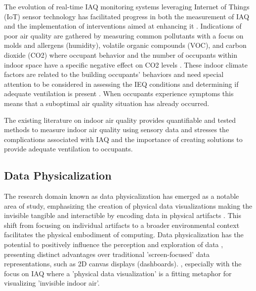 The evolution of real-time IAQ monitoring systems leveraging Internet of Things (IoT) sensor technology has facilitated progress in both the measurement of IAQ and the implementation of interventions aimed at enhancing it \cite{pantelic_transformational_2022}. Indications of poor air quality are gathered by measuring common pollutants with a focus on molds and allergens (humidity), volatile organic compounds (VOC), and carbon dioxide (CO2) \cite{klepeis_national_2001} where occupant behavior and the number of occupants within indoor space have a specific negative effect on CO2 levels \cite{fromme_indoor_2023}. These indoor climate factors are related to the building occupants’ behaviors and need special attention to be considered in assessing the IEQ conditions and determining if adequate ventilation is present \cite{du_indoor_2020}. When occupants experience symptoms this means that a suboptimal air quality situation has already occurred. 

The existing literature on indoor air quality provides quantifiable and tested methods to measure indoor air quality using sensory data and stresses the complications associated with IAQ and the importance of creating solutions to provide adequate ventilation to occupants. 


\subsection{Data Physicalization}

The research domain known as data physicalization \cite{alexander_data_2019} has emerged as a notable area of study, emphasizing the creation of physical data visualizations making the invisible tangible and interactible by encoding data in physical artifacts \cite{ranasinghe_encoding_2023}. This shift from focusing on individual artifacts to a broader environmental context facilitates the physical embodiment of computing. Data physicalization has the potential to positively influence the perception and exploration of data \cite{jansen_opportunities_2015}, presenting distinct advantages over traditional 'screen-focused' data representations, such as 2D canvas displays (dashboards). \cite{hornecker_design_2023}, especially with the focus on IAQ where a 'physical data visualization' is a fitting metaphor for visualizing 'invisible indoor air'.

